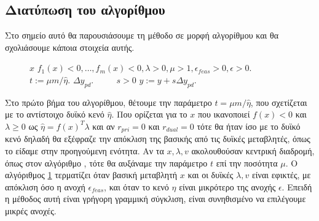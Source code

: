 \subsection{Διατύπωση του αλγορίθμου }
Στο σημείο αυτό θα παρουσιάσουμε τη μέθοδο σε μορφή αλγορίθμου και θα
σχολιάσουμε κάποια στοιχεία αυτής.
\begin{figure}[h]
    \begin{otherlanguage}{english}
        \begin{algorithmic}
            \REQUIRE \(x\)
            \(f_1(x) <0, \dots, f_m(x) < 0, \lambda > 0, \mu > 1,
            \epsilon_{feas} > 0, \epsilon > 0.\)
            \REPEAT
            \STATE {}
            \(t := \mu m / \hat{\eta}.\)
            \STATE {}\(\Delta y_{pd}.\)
            \STATE {}
            \STATE \(\qquad\)
            \( s > 0 \) \(y := y + s \Delta y_{pd}.\)
        \end{algorithmic}
    \end{otherlanguage}
    \caption{}
    \label{alg:ip_pd}
\end{figure}
Στο πρώτο βήμα του αλγορίθμου, θέτουμε την παράμετρο \(t = \mu m /\hat{\eta}\),
που σχετίζεται με το αντίστοιχο δυϊκό κενό \(\hat{\eta}\). Που ορίζεται για το
\(x\) που ικανοποιεί \( f(x) < 0 \) και \( \lambda \geq 0 \) ως \( \hat{\eta}  =
f(x)^T\lambda \) και αν \( r_{pri} = 0 \) και \( r_{dual} = 0 \) τότε θα ήταν
ίσο με το δυϊκό κενό δηλαδή θα εξέφραζε την απόκλιση της βασικής από τις δυϊκές
μεταβλητές, όπως το είδαμε στην προηγούμενη ενότητα. Αν τα \( x, \lambda, v \)
ακολουθούσαν κεντρική διαδρομή, όπως στον αλγόριθμο ,
τότε θα αυξάναμε την παράμετρο \(t\) επί την ποσότητα \(\mu\). Ο αλγόριθμος
\ref{alg:ip_pd} τερματίζει όταν βασική μεταβλητή \(x\) και οι δυϊκές \(\lambda,
v \) είναι εφικτές, με απόκλιση όσο η ανοχή \( \epsilon_{feas} \), και όταν το
κενό \( \hat{\eta} \) είναι μικρότερο της ανοχής \( \epsilon \). Επειδή η
μέθοδος αυτή είναι γρήγορη γραμμική σύγκλιση, είναι συνηθισμένο να επιλέγουμε
μικρές ανοχές.

